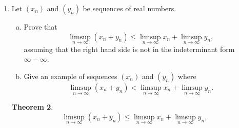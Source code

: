 \documentclass{amsart}
\newtheorem{theorem}{Theorem}
\begin{document}
\begin{enumerate}[1.]
\begin{theorem}
\begin{proof}
        for all $k,l \geq N_y$:
        \[
            d(y_k, y_l) < \frac{\epsilon}{2}
        \]
        Finally note: $(X,d)$ is a metric space, so let $N = \max \{N_x, N_y\}$, and $p,q \geq N$. Then:
        \begin{align*}
            r_p = d(x_p, y_p) &\leq d(x_p, x_q) + d(x_q, y_q) + d(y_q, y_p) \\
            &< \frac{\epsilon}{2} + r_q + \frac{\epsilon}{2} \\
            &= \epsilon + r_q
        \end{align*}
        Fix an $\epsilon > 0$. Let $N = \max \{N_x, N_y\}$, and choose $p,q \geq N$ such that $r_p \geq r_q$. Then we know that:
        \begin{align*}
            r_p &< \epsilon + r_q \\
            r_p - r_q &< \epsilon \\
            |r_p - r_q| &< \epsilon \\
            d(r_p, r_q) &< \epsilon
        \end{align*}
        Thus, $(r_n)$ is Cauchy. Since $(r_n)$ is a sequence of real numbers and $(r_n)$ is Cauchy, 
        by Rudin Thm 3.11x, $(r_n)$ converges.
    \end{proof}
\end{theorem}
\newpage
\item Let $(x_n)$ and $(y_n)$ be sequences of real numbers.
\begin{enumerate}[(a)]
\item Prove that 
\[ \limsup_{n \to \infty} (x_n+y_n) \leq \limsup_{n \to \infty} x_n + \limsup_{n \to \infty} y_n, \]
assuming that the right hand side is not in the indeterminant form $\infty-\infty$.
\item Give an example of sequences $(x_n)$ and $(y_n)$ where
\[ \limsup_{n \to \infty} (x_n+y_n) < \limsup_{n \to \infty} x_n + \limsup_{n \to \infty} y_n.\]
\end{enumerate}
\begin{theorem}
    \[ \limsup_{n \to \infty} (x_n+y_n) \leq \limsup_{n \to \infty} x_n + \limsup_{n \to \infty} y_n, \]

\end{theorem}
\end{enumerate}
\end{document}
